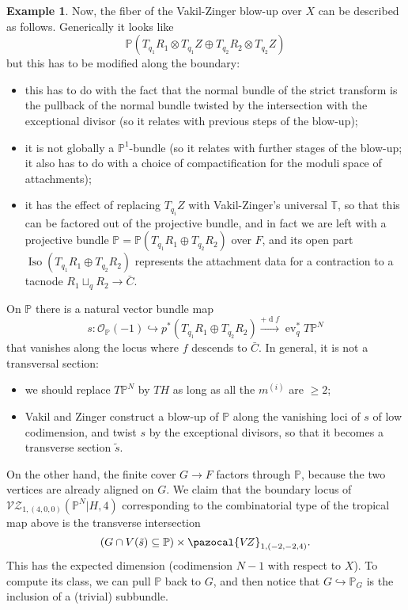 \documentclass[11pt]{amsart}
\newcommand{\PP}{\mathbb P}
\newcommand{\VZ}{\pazocal{V\!Z}}
\newcommand{\VZc}[4]{\mathcal{V\!Z}_{#1,#2}(#3,#4)}
\newcommand{\OO}{\mathcal{O}}
\renewcommand{\to}{\rightarrow}
\newcommand{\ev}{\operatorname{ev}}
\theoremstyle{definition}
\theoremstyle{definition}
\newtheorem{ex}[thm]{Example}
\begin{document}
\begin{ex}
 Now, the fiber of the Vakil-Zinger blow-up over $X$ can be described as follows. Generically it looks like \[\PP(T_{q_1}R_1\otimes T_{q_1}Z\oplus T_{q_2}R_2\otimes T_{q_2}Z)\]
 but this has to be modified along the boundary:
 \begin{itemize}
  \item this has to do with the fact that the normal bundle of the strict transform is the pullback of the normal bundle twisted by the intersection with the exceptional divisor (so it relates with previous steps of the blow-up);
  \item it is not globally a $\PP^1$-bundle (so it relates with further stages of the blow-up; it also has to do with a choice of compactification for the moduli space of attachments);
  \item it has the effect of replacing $T_{q_i}Z$ with Vakil-Zinger's universal $\mathbb T$, so that this can be factored out of the projective bundle, and in fact we are left with a projective bundle $\mathbb P=\PP(T_{q_1}R_1\oplus T_{q_2}R_2)$ over $F$, and its open part $\operatorname{Iso}(T_{q_1}R_1\oplus T_{q_2}R_2)$ represents the attachment data for a contraction to a tacnode $R_1\sqcup_q R_2\to\bar{C}$.
 \end{itemize}
On $\PP$ there is a natural vector bundle map \[s\colon \OO_{\PP}(-1)\hookrightarrow p^*(T_{q_1}R_1\oplus T_{q_2}R_2)\xrightarrow{+\operatorname{d}f}\ev_q^*T\PP^N\]
that vanishes along the locus where $f$ descends to $\bar C$. In general, it is not a transversal section:
\begin{itemize}
 \item we should replace $T\PP^N$ by $TH$ as long as all the $m^{(i)}$ are $\geq2$;
 \item Vakil and Zinger construct a blow-up of $\PP$ along the vanishing loci of $s$ of low codimension, and twist $s$ by the exceptional divisors, so that it becomes a transverse section $\tilde{s}$.
\end{itemize}
On the other hand, the finite cover $G\to F$ factors through $\PP$, because the two vertices are already aligned on $G$. We claim that the boundary locus of $\VZc{1}{(4,0,0)}{\PP^N|H}{4}$ corresponding to the combinatorial type of the tropical map above is the transverse intersection
\[\left(G\cap V(\tilde{s})\subseteq\PP\right)\times\VZ_{1,(-2,-2,4)}.\]
This has the expected dimension (codimension $N-1$ with respect to $X$). To compute its class, we can pull $\PP$ back to $G$, and then notice that $G\hookrightarrow\PP_G$ is the inclusion of a (trivial) subbundle.

\end{ex}
\end{document}
